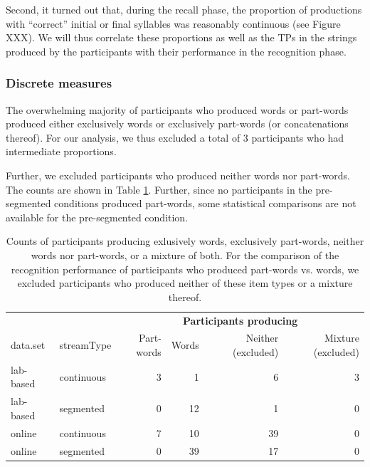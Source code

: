 \documentclass[
]{article}
\begin{document}
Second, it turned out that, during the recall phase, the proportion of
productions with ``correct'' initial or final syllables was reasonably
continuous (see Figure XXX). We will thus correlate these proportions as
well as the TPs in the strings produced by the participants with their
performance in the recognition phase.

\subsubsection{Discrete measures}\label{discrete-measures}

The overwhelming majority of participants who produced words or
part-words produced either exclusively words or exclusively part-words
(or concatenations thereof). For our analysis, we thus excluded a total
of 3 participants who had intermediate proportions.

Further, we excluded participants who produced neither words nor
part-words. The counts are shown in Table
\ref{tab:correlation-recognition-vs-recall-counts}. Further, since no
participants in the pre-segmented conditions produced part-words, some
statistical comparisons are not available for the pre-segmented
condition.

\begin{longtable}[t]{llrrrr}
\caption{\label{tab:correlation-recognition-vs-recall-counts}Counts of participants producing exlusively words, exclusively part-words, neither words nor part-words, or a mixture of both. For the comparison of the recognition performance of participants who produced part-words vs. words, we excluded participants who produced neither of these item types or a mixture thereof.}\\
\toprule
\multicolumn{2}{c}{\textbf{ }} & \multicolumn{4}{c}{\textbf{Participants producing}} \\
\cmidrule(l{3pt}r{3pt}){3-6}
data.set & streamType & Part-words & Words & Neither (excluded) & Mixture (excluded)\\
\midrule
lab-based & continuous & 3 & 1 & 6 & 3\\
lab-based & segmented & 0 & 12 & 1 & 0\\
online & continuous & 7 & 10 & 39 & 0\\
online & segmented & 0 & 39 & 17 & 0\\
\bottomrule
\end{longtable}
\end{document}
